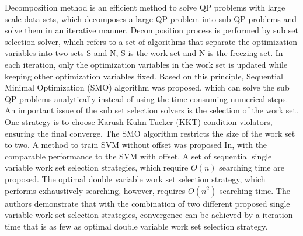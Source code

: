 Decomposition method is an efficient method to solve QP problems with large scale data sets, which decomposes a large QP problem into sub QP problems and solve them in an iterative manner\cite{osuna1997training}\cite{osuna1997improved}. Decomposition process is performed by sub set selection solver, which refers to a set of algorithms that separate the optimization variables into two sets S and N, S is the work set and N is the freezing set. In each iteration, only the optimization variables in the work set is updated while keeping other optimization variables fixed. Based on this principle, Sequential Minimal Optimization (SMO) algorithm\cite{platt1999fast} was proposed, which can solve the sub QP problems analytically instead of using the time consuming numerical steps. An important issue of the sub set selection solvers is the selection of the work set. One strategy is to choose Karush-Kuhn-Tucker (KKT) condition violators, ensuring the final converge\cite{osuna1997improved}. The SMO algorithm restricts the size of the work set to two. A method to train SVM without offset was proposed In\cite{steinwart2011training}, with the comparable performance to the SVM with offset. A set of sequential single variable work set selection strategies, which require $O(n)$ searching time are proposed. The optimal double variable work set selection strategy, which performs exhaustively searching, however, requires $O(n^{2})$ searching time. The authors demonstrate that with the combination of two different proposed single variable work set selection strategies, convergence can be achieved by a iteration time that is as few as optimal double variable work set selection strategy.

